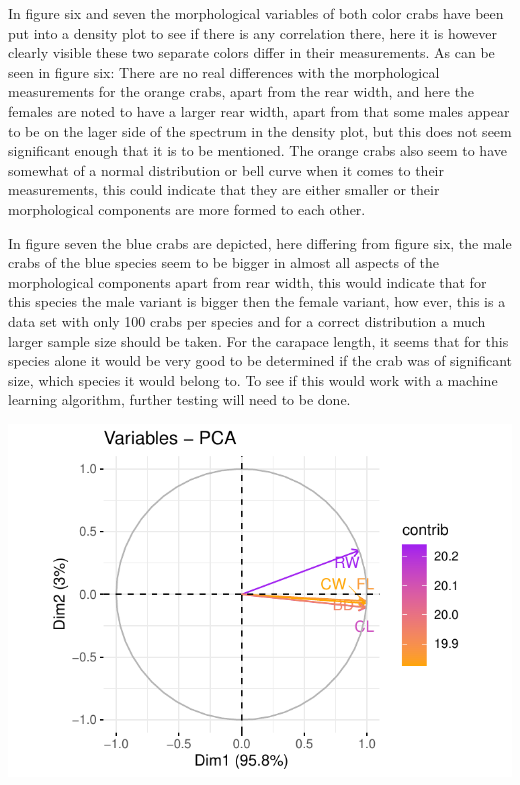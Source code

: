 \documentclass[
]{article}
\begin{document}
In figure six and seven the morphological variables of both color crabs
have been put into a density plot to see if there is any correlation
there, here it is however clearly visible these two separate colors
differ in their measurements. As can be seen in figure six: There are no
real differences with the morphological measurements for the orange
crabs, apart from the rear width, and here the females are noted to have
a larger rear width, apart from that some males appear to be on the
lager side of the spectrum in the density plot, but this does not seem
significant enough that it is to be mentioned. The orange crabs also
seem to have somewhat of a normal distribution or bell curve when it
comes to their measurements, this could indicate that they are either
smaller or their morphological components are more formed to each other.

In figure seven the blue crabs are depicted, here differing from figure
six, the male crabs of the blue species seem to be bigger in almost all
aspects of the morphological components apart from rear width, this
would indicate that for this species the male variant is bigger then the
female variant, how ever, this is a data set with only 100 crabs per
species and for a correct distribution a much larger sample size should
be taken. For the carapace length, it seems that for this species alone
it would be very good to be determined if the crab was of significant
size, which species it would belong to. To see if this would work with a
machine learning algorithm, further testing will need to be done.

\begin{center}\includegraphics{CrabProject_files/figure-latex/pca-1} \end{center}
\end{document}
